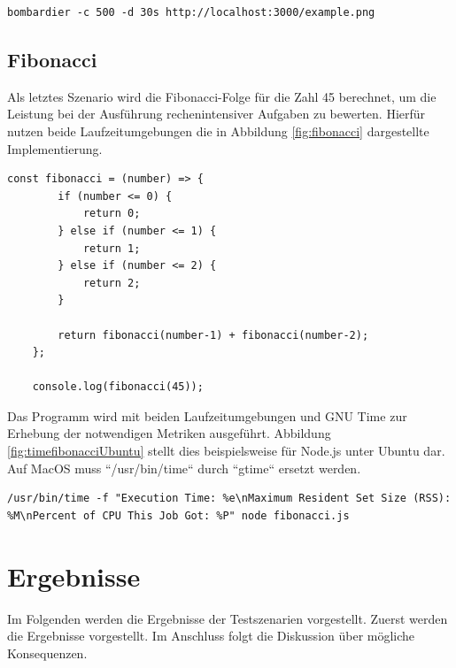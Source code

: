 \begin{lstlisting}[caption={Bombardier File-Server},label={fig:bombardierFileServer}]
	bombardier -c 500 -d 30s http://localhost:3000/example.png
\end{lstlisting}

\subsection{Fibonacci} \label{subsec:fibonacci}
Als letztes Szenario wird die Fibonacci-Folge für die Zahl 45 berechnet, um die Leistung bei der Ausführung rechenintensiver Aufgaben zu bewerten. Hierfür nutzen beide Laufzeitumgebungen die in Abbildung \ref{fig:fibonacci} dargestellte Implementierung.

\begin{lstlisting}[caption={Berechnung der Fibonacci-Folge},label={fig:fibonacci}]
	const fibonacci = (number) => {
		if (number <= 0) {
			return 0;
		} else if (number <= 1) {
			return 1;
		} else if (number <= 2) {
			return 2;
		}
		
		return fibonacci(number-1) + fibonacci(number-2);
	};
	
	console.log(fibonacci(45));
\end{lstlisting}

\noindent
Das Programm wird mit beiden Laufzeitumgebungen und GNU Time zur Erhebung der notwendigen Metriken ausgeführt. Abbildung \ref{fig:timefibonacciUbuntu} stellt dies beispielsweise für Node.js unter Ubuntu dar. Auf MacOS muss ``/usr/bin/time`` durch ``gtime`` ersetzt werden.
\begin{lstlisting}[caption={Fibonacci Node.js},label={fig:timefibonacciUbuntu}]
	/usr/bin/time -f "Execution Time: %e\nMaximum Resident Set Size (RSS): %M\nPercent of CPU This Job Got: %P" node fibonacci.js
\end{lstlisting}



\section{Ergebnisse} \label{sec:performance-results}
Im Folgenden werden die Ergebnisse der Testszenarien vorgestellt. Zuerst werden die Ergebnisse vorgestellt. Im Anschluss folgt die Diskussion über mögliche Konsequenzen.\\


